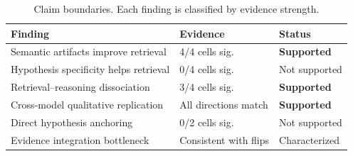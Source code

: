 \begin{table}[t]
\centering
\caption{Claim boundaries. Each finding is classified by evidence strength.}
\label{tab:claims}
\small
\begin{tabular}{lll}
\toprule
Finding & Evidence & Status \\
\midrule
Semantic artifacts improve retrieval & 4/4 cells sig. & \textbf{Supported} \\
Hypothesis specificity helps retrieval & 0/4 cells sig. & Not supported \\
Retrieval--reasoning dissociation & 3/4 cells sig. & \textbf{Supported} \\
Cross-model qualitative replication & All directions match & \textbf{Supported} \\
Direct hypothesis anchoring & 0/2 cells sig. & Not supported \\
Evidence integration bottleneck & Consistent with flips & Characterized \\
\bottomrule
\end{tabular}
\end{table}